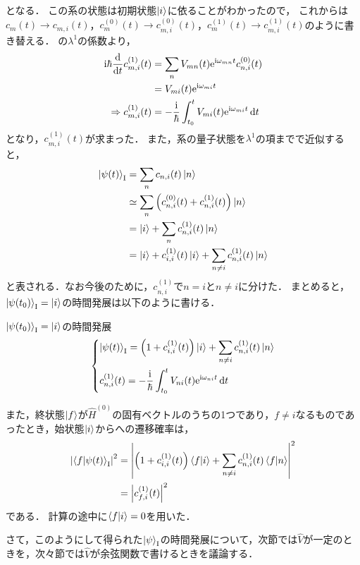 \documentclass{report}
\begin{document}
  となる．
  この系の状態は初期状態$\ket{i}$に依ることがわかったので，
  これからは$c_m(t) \to c_{m, i}(t)$，$c_m^{(0)}(t) \to c_{m, i}^{(0)}(t)$，$c_m^{(1)}(t) \to c_{m, i}^{(1)}(t)$のように書き替える．
  の$\lambda^1$の係数より，
  \begin{align}
    \mathrm{i}\hbar\dv{t}c_{m, i}^{(1)}(t)& = \sum_{n}V_{mn}(t)\mathrm{e}^{\mathrm{i}\omega_{mn}t}c_{n, i}^{(0)}(t)\\
    & = V_{m i}(t)\mathrm{e}^{\mathrm{i}\omega_{mi}t} \\
    \Rightarrow c_{m, i}^{(1)}(t)& = -\frac{\mathrm{i}}{\hbar}\int_{t_0}^{t}V_{m i}(t)\mathrm{e}^{\mathrm{i}\omega_{mi}t}\dd{t}\label{cmi1t-progress}
  \end{align}
  となり，$c_{m, i}^{(1)}(t)$が求まった．
  また，系の量子状態を$\lambda^1$の項までで近似すると，
  \begin{align}
    \ket{\psi(t)}_{\mathrm{I}} &= \sum_{n}c_{n, i}(t)\ket{n} \\ 
    &\simeq \sum_{n} \qty(c_{n, i}^{(0)}(t) + c_{n, i}^{(1)}(t))\ket{n} \\ 
    &= \ket{i} + \sum_{n}c_{n, i}^{(1)}(t)\ket{n} \\ 
    &= \ket{i} + c_{i, i}^{(1)}(t)\ket{i} + \sum_{n\neq i}c_{n, i}^{(1)}(t)\ket{n}
  \end{align}
  と表される．なお今後のために，$c_{n, i}^{(1)}$で$n = i$と$n \neq i$に分けた．
  まとめると，$\ket{\psi(t_0)}_{\mathrm{I}} = \ket{i}$の時間発展は以下のように書ける．
  \begin{itembox}[l]{$\ket{\psi(t_0)}_{\mathrm{I}} = \ket{i}$の時間発展}
    \begin{align}
      \begin{dcases}
        \ket{\psi(t)}_{\mathrm{I}} = \qty(1 + c_{i, i}^{(1)}(t))\ket{i} + \sum_{n\neq i}c_{n, i}^{(1)}(t)\ket{n}\label{interaction-picture-time-development-of-qc} \\
        c_{n, i}^{(1)}(t) = -\frac{\mathrm{i}}{\hbar}\int_{t_0}^{t}V_{ni}(t)\mathrm{e}^{\mathrm{i}\omega_{ni}t}\dd{t}
      \end{dcases}
    \end{align}
  \end{itembox}
  また，終状態$\ket{f}$が$\hat{H}^{(0)}$の固有ベクトルのうちの1つであり，$f \neq i$なるものであったとき，始状態$\ket{i}$からへの遷移確率は，
  \begin{align}
    \abs{\braket{f}{\psi(t)}_{\mathrm{I}}}^2 &= \abs{\qty(1 + c_{i, i}^{(1)}(t))\braket{f}{i} + \sum_{n\neq i}c_{n, i}^{(1)}(t)\braket{f}{n}}^2 \\ 
    &= \abs{c_{f, i}^{(1)}(t)}^2
  \end{align}
  である．
  計算の途中に$\braket{f}{i} = 0$を用いた．
  \par
  さて，このようにして得られた$\ket{\psi}_{\mathrm{I}}$の時間発展について，次節では$\hat{V}$が一定のときを，次々節では$\hat{V}$が余弦関数で書けるときを議論する．
\end{document}
